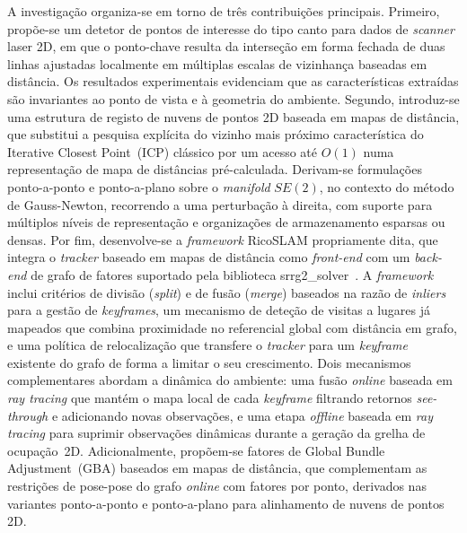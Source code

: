 A investigação organiza-se em torno de três contribuições principais.
Primeiro, propõe-se um detetor de pontos de interesse do tipo canto para
dados de \emph{scanner} laser 2D, em que o ponto-chave resulta da
interseção em forma fechada de duas linhas ajustadas localmente em
múltiplas escalas de vizinhança baseadas em distância. Os resultados
experimentais evidenciam que as características extraídas são invariantes ao
ponto de vista e à geometria do ambiente. Segundo, introduz-se uma
estrutura de registo de nuvens de pontos 2D baseada em mapas de
distância, que substitui a pesquisa explícita do vizinho mais próximo
característica do Iterative Closest Point~(ICP) clássico por um acesso
até $O(1)$ numa representação de mapa de distâncias pré-calculada.
Derivam-se formulações ponto-a-ponto e ponto-a-plano sobre o \emph{manifold}
$SE(2)$, no contexto do método de Gauss-Newton, recorrendo a uma
perturbação à direita, com suporte para múltiplos níveis de
representação e organizações de armazenamento esparsas ou densas.
Por fim, desenvolve-se a \emph{framework} RicoSLAM propriamente dita, que
integra o \emph{tracker} baseado em mapas de distância como
\emph{front-end} com um \emph{back-end} de grafo de fatores suportado
pela biblioteca srrg2\_solver~\cite{grisetti:robotics:2020}.
A \emph{framework} inclui critérios de divisão (\emph{split}) e de fusão
(\emph{merge}) baseados na razão de \emph{inliers} para a gestão de
\emph{keyframes}, um mecanismo de deteção de visitas a lugares já mapeados que
combina proximidade no referencial global com
distância em grafo, e uma política de relocalização que
transfere o \emph{tracker} para um \emph{keyframe} existente do grafo de
forma a limitar o seu crescimento. Dois mecanismos complementares
abordam a dinâmica do ambiente: uma fusão \emph{online} baseada em \emph{ray tracing}
que mantém o mapa local de cada \emph{keyframe} filtrando retornos \emph{see-through}
e adicionando novas observações, e uma etapa \emph{offline} baseada em \emph{ray tracing}
para suprimir observações dinâmicas durante a geração da grelha de
ocupação~2D. Adicionalmente, propõem-se fatores de Global Bundle
Adjustment~(GBA) baseados em mapas de distância, que
complementam as restrições de pose-pose do grafo \emph{online} com
fatores por ponto, derivados nas variantes ponto-a-ponto e
ponto-a-plano para alinhamento de nuvens de pontos 2D.

